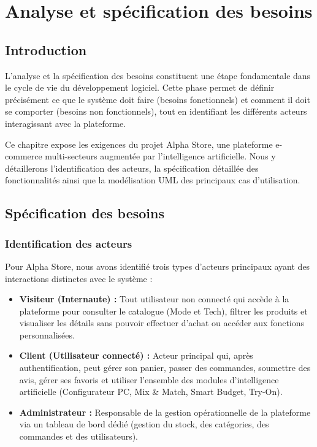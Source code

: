 \chapter{Analyse et spécification des besoins}
\label{chap:analyse_besoins}

\section{Introduction}

L'analyse et la spécification des besoins constituent une étape fondamentale dans le cycle de vie du développement logiciel. Cette phase permet de définir précisément ce que le système doit faire (besoins fonctionnels) et comment il doit se comporter (besoins non fonctionnels), tout en identifiant les différents acteurs interagissant avec la plateforme. 

Ce chapitre expose les exigences du projet Alpha Store, une plateforme e-commerce multi-secteurs augmentée par l'intelligence artificielle. Nous y détaillerons l'identification des acteurs, la spécification détaillée des fonctionnalités ainsi que la modélisation UML des principaux cas d'utilisation.

\section{Spécification des besoins}

\subsection{Identification des acteurs}

Pour Alpha Store, nous avons identifié trois types d'acteurs principaux ayant des interactions distinctes avec le système :

\begin{itemize}[label=$\bullet$]
    \item \textbf{Visiteur (Internaute) :} Tout utilisateur non connecté qui accède à la plateforme pour consulter le catalogue (Mode et Tech), filtrer les produits et visualiser les détails sans pouvoir effectuer d'achat ou accéder aux fonctions personnalisées.
    \item \textbf{Client (Utilisateur connecté) :} Acteur principal qui, après authentification, peut gérer son panier, passer des commandes, soumettre des avis, gérer ses favoris et utiliser l'ensemble des modules d'intelligence artificielle (Configurateur PC, Mix \& Match, Smart Budget, Try-On).
    \item \textbf{Administrateur :} Responsable de la gestion opérationnelle de la plateforme via un tableau de bord dédié (gestion du stock, des catégories, des commandes et des utilisateurs).
\end{itemize}

